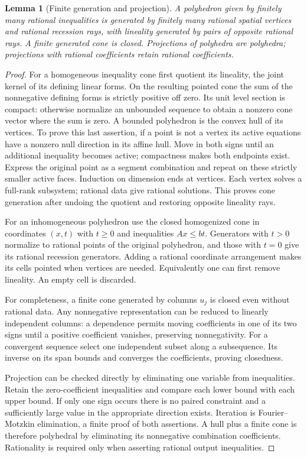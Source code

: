 \documentclass[11pt]{article}
\newtheorem{lemma}[theorem]{Lemma}
\theoremstyle{definition}\newtheorem{definition}[theorem]{Definition}
\theoremstyle{remark}\newtheorem{remark}[theorem]{Remark}
\begin{document}
\begin{lemma}[Finite generation and projection]\label{generation}
A polyhedron given by finitely many rational inequalities is generated by finitely many rational spatial vertices and rational recession rays, with lineality generated by pairs of opposite rational rays. A finite generated cone is closed. Projections of polyhedra are polyhedra; projections with rational coefficients retain rational coefficients.
\end{lemma}
\begin{proof}
For a homogeneous inequality cone first quotient its lineality, the joint kernel of its defining linear forms. On the resulting pointed cone the sum of the nonnegative defining forms is strictly positive off zero. Its unit level section is compact: otherwise normalize an unbounded sequence to obtain a nonzero cone vector where the sum is zero. A bounded polyhedron is the convex hull of its vertices. To prove this last assertion, if a point is not a vertex its active equations have a nonzero null direction in its affine hull. Move in both signs until an additional inequality becomes active; compactness makes both endpoints exist. Express the original point as a segment combination and repeat on these strictly smaller active faces. Induction on dimension ends at vertices. Each vertex solves a full-rank subsystem; rational data give rational solutions. This proves cone generation after undoing the quotient and restoring opposite lineality rays.

For an inhomogeneous polyhedron use the closed homogenized cone in coordinates $(x,t)$ with $t\geq0$ and inequalities $Ax\leq bt$. Generators with $t>0$ normalize to rational points of the original polyhedron, and those with $t=0$ give its rational recession generators. Adding a rational coordinate arrangement makes its cells pointed when vertices are needed. Equivalently one can first remove lineality. An empty cell is discarded.

For completeness, a finite cone generated by columns $u_j$ is closed even without rational data. Any nonnegative representation can be reduced to linearly independent columns: a dependence permits moving coefficients in one of its two signs until a positive coefficient vanishes, preserving nonnegativity. For a convergent sequence select one independent subset along a subsequence. Its inverse on its span bounds and converges the coefficients, proving closedness.

Projection can be checked directly by eliminating one variable from inequalities. Retain the zero-coefficient inequalities and compare each lower bound with each upper bound. If only one sign occurs there is no paired constraint and a sufficiently large value in the appropriate direction exists. Iteration is Fourier--Motzkin elimination, a finite proof of both assertions. A hull plus a finite cone is therefore polyhedral by eliminating its nonnegative combination coefficients. Rationality is required only when asserting rational output inequalities.
\end{proof}
\end{document}
